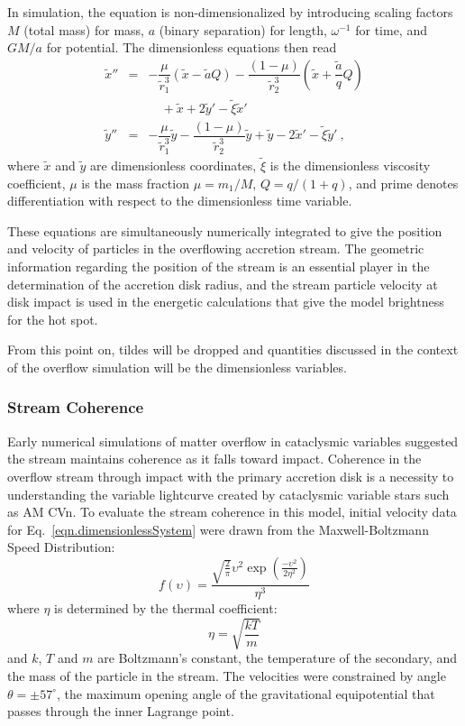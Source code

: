 \documentclass[preprint2]{aastex}
\begin{document}
In simulation, the equation is non-dimensionalized by introducing
scaling factors $M$ (total mass) for mass, $a$ (binary separation) for
length, $\omega^{-1}$ for time, and $GM/a$ for potential.  The
dimensionless equations then read
\begin{eqnarray}
   \tilde{x}'' &=& -\dfrac{\mu}{\tilde{r}_1^3}(\tilde{x} - \tilde{a}Q) -
   \dfrac{(1-\mu)}{\tilde{r}_2^3}\left (\tilde{x} +
   \dfrac{\tilde{a}}{q}Q\right ) \nonumber \\
   & &\quad + \tilde{x} + 2\tilde{y}' - \tilde{\xi}\tilde{x}' 
   \nonumber \\
   \tilde{y}'' &=& -\dfrac{\mu}{\tilde{r}_1^3}\tilde{y} -
   \dfrac{(1-\mu)}{\tilde{r}_2^3}\tilde{y} + \tilde{y} - 2\tilde{x}' -
   \tilde{\xi}\tilde{y}'\ ,
   \label{eqn.dimensionlessSystem}
\end{eqnarray}
where $\tilde{x}$ and $\tilde{y}$ are dimensionless coordinates,
$\tilde{\xi}$ is the dimensionless viscosity coefficient, $\mu$ is the
mass fraction $\mu = m_1/M$, $Q=q/(1+q)$, and prime denotes
differentiation with respect to the dimensionless time variable.

These equations are simultaneously numerically integrated to give 
the position and velocity of particles in the overflowing accretion 
stream. The geometric information regarding the position of the 
stream is an essential player in the determination of the accretion 
disk radius, and the stream particle velocity at disk impact is used 
in the energetic calculations that give the model brightness for the 
hot spot.

From this point on, tildes will be dropped and quantities discussed in
the context of the overflow simulation will be the dimensionless
variables.

\subsubsection{Stream Coherence}
Early numerical simulations \citep{Flannery1975} of matter overflow in
cataclysmic variables suggested the stream maintains coherence as it
falls toward impact.  Coherence in the overflow stream through impact
with the primary accretion disk is a necessity to understanding the
variable lightcurve created by cataclysmic variable stars such as AM
CVn.  To evaluate the stream coherence in this model, initial 
velocity data for Eq.\ \ref{eqn.dimensionlessSystem} were drawn from the
Maxwell-Boltzmann Speed Distribution:
\begin{equation}
   f(\upsilon)=\frac{\sqrt{\frac{2}{\pi}}\upsilon^2
   \exp(\frac{-\upsilon^2}{2\eta^2})}{\eta^3}
\end{equation}
where $\eta$ is determined by the thermal coefficient:
\begin{equation}
	\eta=\sqrt{\frac{kT}{m}}
\end{equation}
and $k$, $T$ and $m$ are Boltzmann's constant, the temperature of the
secondary, and the mass of the particle in the stream. The velocities were constrained by angle $\theta=\pm57^{\circ}$, the
maximum opening angle of the gravitational equipotential that passes
through the inner Lagrange point.  
\end{document}
